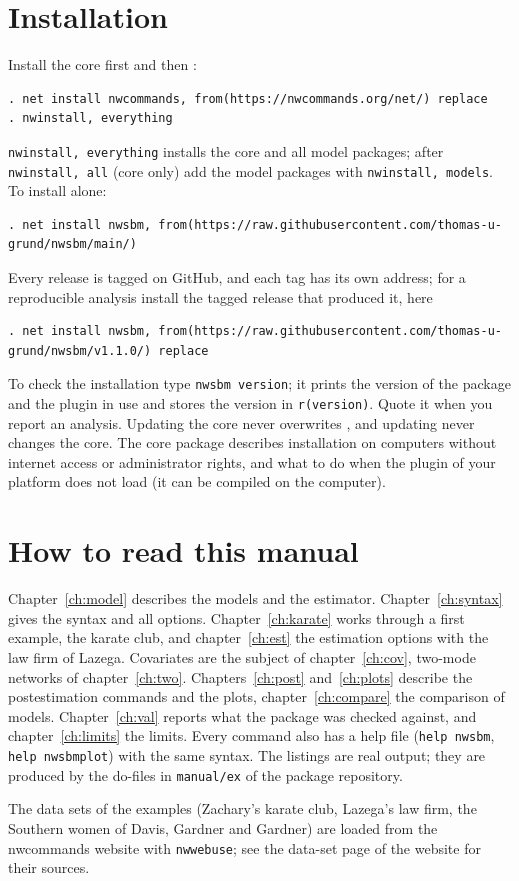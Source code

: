 \section{Installation}
Install the core first and then \nwsbm{}:
\begin{lstlisting}
. net install nwcommands, from(https://nwcommands.org/net/) replace
. nwinstall, everything
\end{lstlisting}
\texttt{nwinstall, everything} installs the core and all model packages; after \texttt{nwinstall, all} (core only) add the model packages with \texttt{nwinstall, models}. To install \nwsbm{} alone:
\begin{lstlisting}
. net install nwsbm, from(https://raw.githubusercontent.com/thomas-u-grund/nwsbm/main/)
\end{lstlisting}
Every release is tagged on GitHub, and each tag has its own address; for a reproducible analysis install the tagged release that produced it, here
\begin{lstlisting}
. net install nwsbm, from(https://raw.githubusercontent.com/thomas-u-grund/nwsbm/v1.1.0/) replace
\end{lstlisting}
To check the installation type \texttt{nwsbm version}; it prints the version of the package and the plugin in use and stores the version in \texttt{r(version)}. Quote it when you report an analysis. Updating the core never overwrites \nwsbm{}, and updating \nwsbm{} never changes the core. The core package describes installation on computers without internet access or administrator rights, and what to do when the plugin of your platform does not load (it can be compiled on the computer).

\section{How to read this manual}
Chapter~\ref{ch:model} describes the models and the estimator. Chapter~\ref{ch:syntax} gives the syntax and all options. Chapter~\ref{ch:karate} works through a first example, the karate club, and chapter~\ref{ch:est} the estimation options with the law firm of Lazega. Covariates are the subject of chapter~\ref{ch:cov}, two-mode networks of chapter~\ref{ch:two}. Chapters~\ref{ch:post} and~\ref{ch:plots} describe the postestimation commands and the plots, chapter~\ref{ch:compare} the comparison of models. Chapter~\ref{ch:val} reports what the package was checked against, and chapter~\ref{ch:limits} the limits. Every command also has a help file (\texttt{help nwsbm}, \texttt{help nwsbmplot}) with the same syntax. The listings are real output; they are produced by the do-files in \texttt{manual/ex} of the package repository.

The data sets of the examples (Zachary's karate club, Lazega's law firm, the Southern women of Davis, Gardner and Gardner) are loaded from the nwcommands website with \texttt{nwwebuse}; see the data-set page of the website for their sources.
